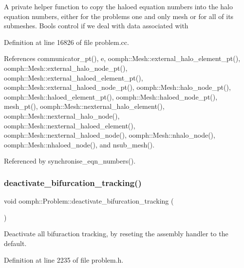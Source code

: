 A private helper function to copy the haloed equation numbers into the halo equation numbers, either for the problem\textquotesingle{}s one and only mesh or for all of its submeshes. Bools control if we deal with data associated with 

Definition at line 16826 of file problem.\+cc.



References communicator\+\_\+pt(), e, oomph\+::\+Mesh\+::external\+\_\+halo\+\_\+element\+\_\+pt(), oomph\+::\+Mesh\+::external\+\_\+halo\+\_\+node\+\_\+pt(), oomph\+::\+Mesh\+::external\+\_\+haloed\+\_\+element\+\_\+pt(), oomph\+::\+Mesh\+::external\+\_\+haloed\+\_\+node\+\_\+pt(), oomph\+::\+Mesh\+::halo\+\_\+node\+\_\+pt(), oomph\+::\+Mesh\+::haloed\+\_\+element\+\_\+pt(), oomph\+::\+Mesh\+::haloed\+\_\+node\+\_\+pt(), mesh\+\_\+pt(), oomph\+::\+Mesh\+::nexternal\+\_\+halo\+\_\+element(), oomph\+::\+Mesh\+::nexternal\+\_\+halo\+\_\+node(), oomph\+::\+Mesh\+::nexternal\+\_\+haloed\+\_\+element(), oomph\+::\+Mesh\+::nexternal\+\_\+haloed\+\_\+node(), oomph\+::\+Mesh\+::nhalo\+\_\+node(), oomph\+::\+Mesh\+::nhaloed\+\_\+node(), and nsub\+\_\+mesh().



Referenced by synchronise\+\_\+eqn\+\_\+numbers().

\mbox{\label{classoomph_1_1Problem_ac5b47ae12ed6445e52c65596dfa97c6d}} 
\subsubsection{\texorpdfstring{deactivate\+\_\+bifurcation\+\_\+tracking()}{deactivate\_bifurcation\_tracking()}}
{\footnotesize\ttfamily void oomph\+::\+Problem\+::deactivate\+\_\+bifurcation\+\_\+tracking (\begin{DoxyParamCaption}{ }\end{DoxyParamCaption})\hspace{0.3cm}{\ttfamily [inline]}}



Deactivate all bifuraction tracking, by reseting the assembly handler to the default. 



Definition at line 2235 of file problem.\+h.



